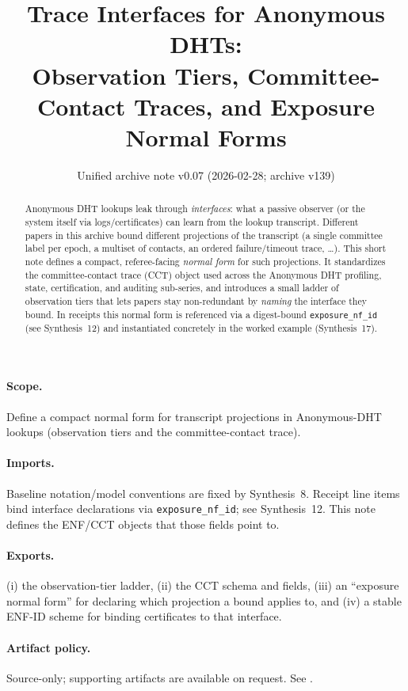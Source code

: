 \documentclass[11pt]{article}
\title{Trace Interfaces for Anonymous DHTs:\\ Observation Tiers, Committee-Contact Traces, and Exposure Normal Forms}
\author{}
\date{Unified archive note v0.07 (2026-02-28; archive v139)}
\begin{document}
\maketitle

\begin{abstract}
Anonymous DHT lookups leak through \emph{interfaces}: what a passive observer (or the system itself via logs/certificates) can learn from the lookup transcript.
Different papers in this archive bound different projections of the transcript (a single committee label per epoch, a multiset of contacts, an ordered failure/timeout trace, \ldots).
This short note defines a compact, referee-facing \emph{normal form} for such projections.
It standardizes the committee-contact trace (CCT) object used across the Anonymous DHT profiling, state, certification, and auditing sub-series, and introduces a small ladder of observation tiers that lets papers stay non-redundant by \emph{naming} the interface they bound.
In receipts this normal form is referenced via a digest-bound \texttt{exposure\_nf\_id} (see Synthesis~12) and instantiated concretely in the worked example (Synthesis~17).
\end{abstract}

\paragraph{Scope.}
Define a compact normal form for transcript projections in Anonymous-DHT lookups (observation tiers and the committee-contact trace).

\paragraph{Imports.}
Baseline notation/model conventions are fixed by Synthesis~8.\cite{series:notation}
Receipt line items bind interface declarations via \texttt{exposure\_nf\_id}; see Synthesis~12.\cite{series:receiptitems}
This note defines the ENF/CCT objects that those fields point to.

\paragraph{Exports.}
(i) the observation-tier ladder, (ii) the CCT schema and fields, (iii) an ``exposure normal form'' for declaring which projection a bound applies to, and (iv) a stable ENF-ID scheme for binding certificates to that interface.

\paragraph{Artifact policy.}
Source-only; supporting artifacts are available on request. See \cite{series:artifactpolicy}.
\end{document}
